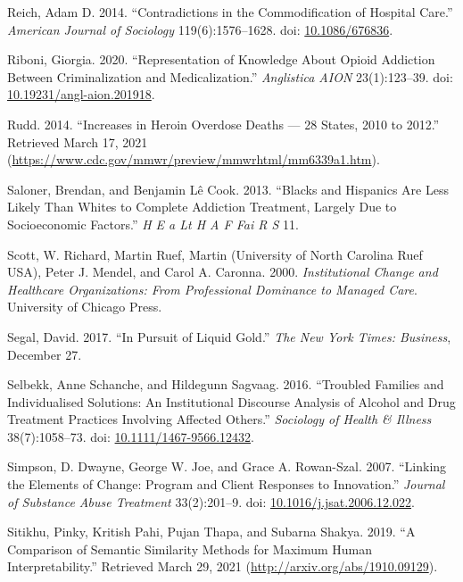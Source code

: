 \documentclass[
  12pt,
]{article}
\begin{document}
\leavevmode\hypertarget{ref-reich2014}{}%
Reich, Adam D. 2014. ``Contradictions in the Commodification of Hospital Care.'' \emph{American Journal of Sociology} 119(6):1576--1628. doi: \href{https://doi.org/10.1086/676836}{10.1086/676836}.

\leavevmode\hypertarget{ref-riboni2020}{}%
Riboni, Giorgia. 2020. ``Representation of Knowledge About Opioid Addiction Between Criminalization and Medicalization.'' \emph{Anglistica AION} 23(1):123--39. doi: \href{https://doi.org/10.19231/angl-aion.201918}{10.19231/angl-aion.201918}.

\leavevmode\hypertarget{ref-rudd2014}{}%
Rudd. 2014. ``Increases in Heroin Overdose Deaths --- 28 States, 2010 to 2012.'' Retrieved March 17, 2021 (\url{https://www.cdc.gov/mmwr/preview/mmwrhtml/mm6339a1.htm}).

\leavevmode\hypertarget{ref-saloner2013}{}%
Saloner, Brendan, and Benjamin Lê Cook. 2013. ``Blacks and Hispanics Are Less Likely Than Whites to Complete Addiction Treatment, Largely Due to Socioeconomic Factors.'' \emph{H E a Lt H A F Fai R S} 11.

\leavevmode\hypertarget{ref-scott2000}{}%
Scott, W. Richard, Martin Ruef, Martin (University of North Carolina Ruef USA), Peter J. Mendel, and Carol A. Caronna. 2000. \emph{Institutional Change and Healthcare Organizations: From Professional Dominance to Managed Care}. University of Chicago Press.

\leavevmode\hypertarget{ref-segal2017}{}%
Segal, David. 2017. ``In Pursuit of Liquid Gold.'' \emph{The New York Times: Business}, December 27.

\leavevmode\hypertarget{ref-selbekk2016}{}%
Selbekk, Anne Schanche, and Hildegunn Sagvaag. 2016. ``Troubled Families and Individualised Solutions: An Institutional Discourse Analysis of Alcohol and Drug Treatment Practices Involving Affected Others.'' \emph{Sociology of Health \& Illness} 38(7):1058--73. doi: \href{https://doi.org/10.1111/1467-9566.12432}{10.1111/1467-9566.12432}.

\leavevmode\hypertarget{ref-simpson2007}{}%
Simpson, D. Dwayne, George W. Joe, and Grace A. Rowan-Szal. 2007. ``Linking the Elements of Change: Program and Client Responses to Innovation.'' \emph{Journal of Substance Abuse Treatment} 33(2):201--9. doi: \href{https://doi.org/10.1016/j.jsat.2006.12.022}{10.1016/j.jsat.2006.12.022}.

\leavevmode\hypertarget{ref-sitikhu2019}{}%
Sitikhu, Pinky, Kritish Pahi, Pujan Thapa, and Subarna Shakya. 2019. ``A Comparison of Semantic Similarity Methods for Maximum Human Interpretability.'' Retrieved March 29, 2021 (\url{http://arxiv.org/abs/1910.09129}).
\end{document}
